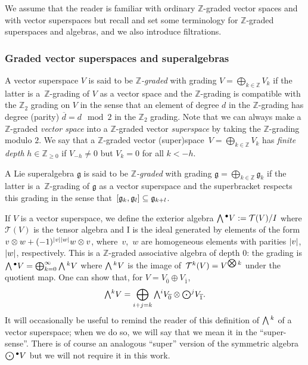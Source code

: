 \documentclass[11pt]{article}
\numberwithin{equation}{section}
\numberwithin{equation}{section}
\newcommand{\fg}{\mathfrak{g}}
\newcommand{\ZZ}{\mathbb{Z}}
\newcommand{\Wedge}{\mathchoice{{\textstyle\bigwedge}}{\bigwedge}{\bigwedge}{\bigwedge}}	%
\newcommand{\Odot}{\mathchoice{{\textstyle\bigodot}}{\bigodot}{\bigodot}{\bigodot}}
\newcommand{\Otimes}{\mathchoice{{\textstyle\bigotimes}}{\bigotimes}{\bigotimes}{\bigotimes}}
\newcommand{\1}{\mathbbm{1}}
\begin{document}
We assume that the reader is familiar with ordinary $\ZZ$-graded vector spaces and with vector superspaces but recall and set some terminology for $\ZZ$-graded superspaces and algebras, and we also introduce filtrations.

\subsubsection{Graded vector superspaces and superalgebras}
\label{sec:graded-superalg}

A vector superspace $V$ is said to be \emph{$\ZZ$-graded} with grading $V=\bigoplus_{k\in\ZZ}V_k$ if the latter is a~$\ZZ$-grading of $V$ as a vector space and the $\ZZ$-grading is compatible with the $\ZZ_2$ grading on $V$ in the sense that an element of degree $d$ in the $\ZZ$-grading has degree (parity) $\overline{d}=d\mod 2$ in the $\ZZ_2$ grading. Note that we can always make a $\ZZ$-graded \emph{vector space} into a $\ZZ$-graded vector \emph{superspace} by taking the $\ZZ$-grading modulo $2$. We say that a $\ZZ$-graded vector (super)space~${V=\bigoplus_{k\in\ZZ}V_k}$ has \emph{finite depth} $h\in\ZZ_{\geq 0}$ if $V_{-h}\neq 0$ but $V_k=0$ for all $k<-h$.

A Lie superalgebra $\fg$ is said to be \emph{$\ZZ$-graded} with grading $\fg=\bigoplus_{k\in\ZZ}\fg_k$ if the latter is a~$\ZZ$-grading of $\fg$ as a vector superspace and the superbracket respects this grading in the sense that~${\comm{\fg_k}{\fg_l}\subseteq\fg_{k+l}}$.

If $V$ is a vector superspace, we define the exterior algebra $\Wedge^\bullet V:=\mathcal{T}(V)/I$ where $\mathcal{T}(V)$ is the tensor algebra and I is the ideal generated by elements of the form $v\otimes w + (-1)^{\abs{v}\abs{w}}w\otimes v$, where~$v$,~$w$ are homogeneous elements with parities $\abs{v}$, $\abs{w}$, respectively. This is a $\ZZ$-graded associative algebra of depth 0: the grading is $\Wedge^\bullet V = \bigoplus_{k=0}^\infty \Wedge^k V$ where $\Wedge^k V$ is the image of~${\mathcal{T}^k(V)= V^{\Otimes k}}$ under the quotient map. One can show that, for $V=V_{\overline{0}}\oplus V_{\overline{1}}$,
\begin{equation}\label{eq:super-wedge}
	\Wedge^k V = \bigoplus_{i+j=k}\Wedge^i V_{\overline{0}}\otimes\Odot^j V_{\overline{1}}.
\end{equation}
It will occasionally be useful to remind the reader of this definition of $\Wedge^k$ of a vector superspace; when we do so, we will say that we mean it in the ``super-sense''. There is of course an analogous ``super'' version of the symmetric algebra $\Odot^\bullet V$ but we will not require it in this work.
\end{document}
